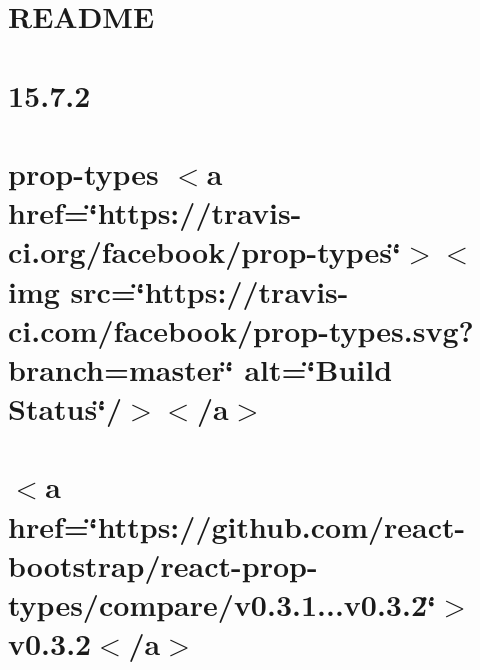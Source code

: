 \let\mypdfximage\pdfximage\def\pdfximage{\immediate\mypdfximage}\documentclass[twoside]{book}
\newcommand{\+}{\discretionary{\mbox{\scriptsize$\hookleftarrow$}}{}{}}
\begin{document}
\chapter{README}
\label{md__c___users_zhart__one_drive__desktop_school_capstone_workspace_capstone_flight_risk_assesment3d6ac541a236ec9ebde7bc079db87c86}

\chapter{15.7.2}
\label{md__c___users_zhart__one_drive__desktop_school_capstone_workspace_capstone_flight_risk_assesment3618afaff44b3a40f03c4e45459a5ba8}

\chapter{prop-\/types $<$a href=\char`\"{}https\+://travis-\/ci.\+org/facebook/prop-\/types\char`\"{}$>$$<$img src=\char`\"{}https\+://travis-\/ci.\+com/facebook/prop-\/types.\+svg?branch=master\char`\"{} alt=\char`\"{}\+Build Status\char`\"{}/$>$$<$/a$>$}
\label{md__c___users_zhart__one_drive__desktop_school_capstone_workspace_capstone_flight_risk_assesment35914d72a9e90944cdc08f52c827d5f5}

\chapter{$<$a href=\char`\"{}https\+://github.\+com/react-\/bootstrap/react-\/prop-\/types/compare/v0.\+3.\+1...\+v0.\+3.\+2\char`\"{}$>$v0.3.2$<$/a$>$}
\label{md__c___users_zhart__one_drive__desktop_school_capstone_workspace_capstone_flight_risk_assesmentf19818b8506c5b55f8e6417265182e39}

\end{document}

